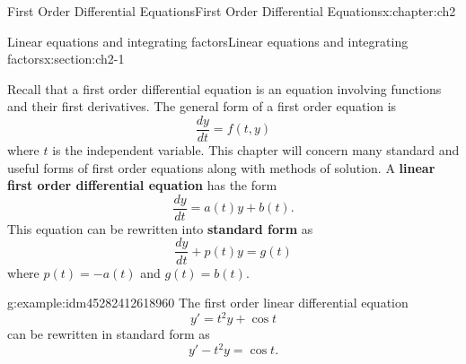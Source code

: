 \documentclass[oneside,10pt,]{book}
\newcommand{\terminology}[1]{\textbf{#1}}
\numberwithin{equation}{section}
\numberwithin{equation}{section}
\begin{document}
\begin{chapterptx}{First Order Differential Equations}{}{First Order Differential Equations}{}{}{x:chapter:ch2}
%
%
\typeout{************************************************}
\typeout{************************************************}
%
\begin{sectionptx}{Linear equations and integrating factors}{}{Linear equations and integrating factors}{}{}{x:section:ch2-1}
\begin{introduction}{}%
Recall that a first order differential equation is an equation involving functions and their first derivatives. The general form of a first order equation is%
\begin{equation*}
\frac{dy}{dt} = f(t, y)
\end{equation*}
where \(t\) is the independent variable. This chapter will concern many standard and useful forms of first order equations along with methods of solution. A \terminology{linear first order differential equation} has the form%
\begin{equation*}
\frac{dy}{dt} = a(t) y + b(t).
\end{equation*}
This equation can be rewritten into \terminology{standard form} as%
\begin{equation*}
\frac{dy}{dt} + p(t) y = g(t)
\end{equation*}
where \(p(t) = -a(t)\) and \(g(t) = b(t)\).%
\begin{example}{}{g:example:idm45282412618960}%
The first order linear differential equation%
\begin{equation*}
y' = t^2 y + \cos t
\end{equation*}
can be rewritten in standard form as%
\begin{equation*}
y' - t^2 y = \cos t.
\end{equation*}
%
\end{example}
\end{introduction}%
%
%
\typeout{************************************************}
\typeout{************************************************}
%
\end{sectionptx}
\end{chapterptx}
\end{document}
